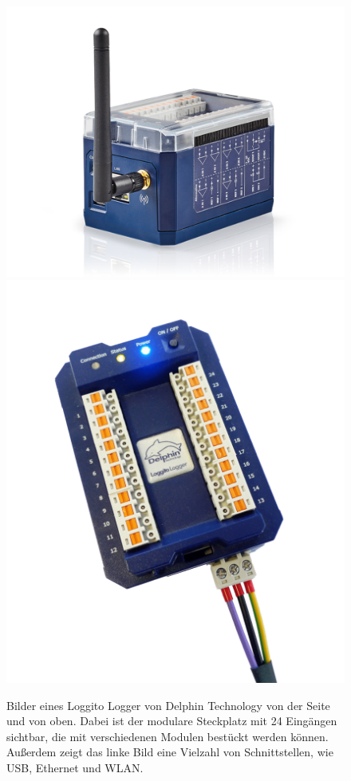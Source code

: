 \begin{figure}[!htb]
	\centering
	\includegraphics[height=0.3\textheight]{images/Loggito.png}
	\includegraphics[height=0.3\textheight]{images/Loggito-von-oben.png}
	\caption[Bilder eines Loggito Logger von Delphin Technology.]{
		Bilder eines Loggito Logger von Delphin Technology von der Seite und von oben.
		Dabei ist der modulare Steckplatz mit 24 Eingängen sichtbar, die mit verschiedenen Modulen bestückt werden können.
		Außerdem zeigt das linke Bild eine Vielzahl von Schnittstellen, wie USB, Ethernet und WLAN.\footnotemark
	}
	\label{pic:loggito}
\end{figure}

